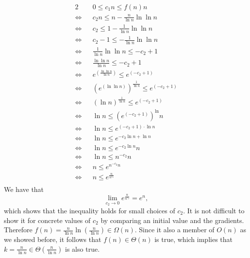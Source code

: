 \documentclass[11pt]{article}
\numberwithin{equation}{section}
\renewcommand{\iff}{\Leftrightarrow}
\begin{document}
\begin{alignat*}{2}
    && 0 \leq c_1 n \leq f(n) n\\
    \iff&& c_2 n \leq n -\frac{n}{\ln n} \ln \ln n\\
    \iff&& c_2 \leq 1 -\frac{1}{\ln n} \ln \ln n\\
    \iff&& c_2 -1 \leq -\frac{1}{\ln n} \ln \ln n\\
    \iff&& \frac{1}{\ln n} \ln \ln n \leq -c_2 + 1\\
    \iff&& \frac{\ln \ln n}{\ln n}  \leq -c_2 + 1\\
    \iff&& e^{\left(\frac{\ln \ln n}{\ln n}\right)}  \leq e^{(-c_2 + 1)}\\
    \iff&& {(e^{\left(\ln \ln n\right)})}^{\frac{1}{\ln n}} \leq e^{(-c_2 + 1)}\\
    \iff&& {(\ln n)}^{\frac{1}{\ln n}} \leq e^{(-c_2 + 1)}\\
    \iff&& \ln n \leq {(e^{(-c_2 + 1)})}^\ln n\\
    \iff&& \ln n \leq e^{(-c_2 + 1) \cdot \ln n}\\
    \iff&& \ln n \leq e^{-c_2 \ln n + \ln n}\\
    \iff&& \ln n \leq e^{-c_2 \ln n} n\\
    \iff&& \ln n \leq n^{-c_2} n\\
    \iff&& n \leq e^{n^{-c_2} n}\\
    \iff&& n \leq e^{\frac{n}{n^{c_2}}}\\
\end{alignat*}
We have that 
\[
    \lim_{c_2 \to 0} e^{\frac{n}{n^{c_2}}} = e^{n},
\]
which shows that the inequality holds for small choices of $c_2$. It is not difficult to 
show it for concrete values of $c_2$ by comparing an initial value and the gradients. 
Therefore $f(n) = \frac{n}{\ln n} \ln \left(\frac{n}{\ln n}\right) \in \Omega(n)$. Since
it also a member of $O(n)$ as we showed before, it follows that $f(n) \in \Theta(n)$ is true,
which implies that $k = \frac{n}{\ln n} \in \Theta(\frac{n}{\ln n})$ is also true.
\end{document}
